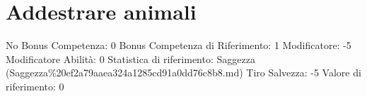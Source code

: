 \section{Addestrare animali}\label{addestrare-animali}

\begin{description}
\tightlist
\item[Tags: ABI]
No Bonus Competenza: 0 Bonus Competenza di Riferimento: 1 Modificatore:
-5 Modificatore Abilità: 0 Statistica di riferimento: Saggezza
(Saggezza\%20ef2a79aaea324a1285cd91a0dd76c8b8.md) Tiro Salvezza: -5
Valore di riferimento: 0
\end{description}
